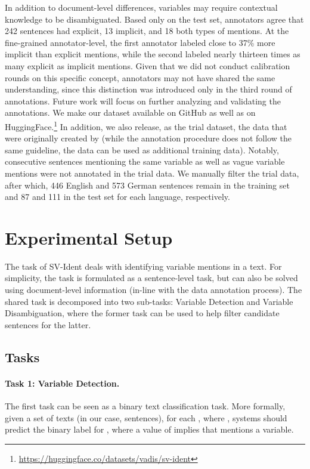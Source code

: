 \documentclass[11pt]{article}
\begin{document}
In addition to document-level differences, variables may require contextual knowledge to be disambiguated.
Based only on the test set, annotators agree that 242 sentences had explicit, 13 implicit, and 18 both types of mentions.
At the fine-grained annotator-level, the first annotator labeled close to 37\% more implicit than explicit mentions, while the second labeled nearly thirteen times as many explicit as implicit mentions.
Given that we did not conduct calibration rounds on this specific concept, annotators may not have shared the same understanding, since this distinction was introduced only in the third round of annotations.
Future work will focus on further analyzing and validating the annotations.
We make our dataset available on GitHub as well as on HuggingFace.\footnote{\url{https://huggingface.co/datasets/vadis/sv-ident}}
In addition, we also release, as the trial dataset, the data that were originally created by \citet{zielinski-mutschke-2018-towards} (while the annotation procedure does not follow the same guideline, the data can be used as additional training data).
Notably, consecutive sentences mentioning the same variable as well as vague variable mentions were not annotated in the trial data.
We manually filter the trial data, after which, 446 English and 573 German sentences remain in the training set and 87 and 111 in the test set for each language, respectively.


\section{Experimental Setup}
\label{sec:experimental-setup}
The task of SV-Ident deals with identifying variable mentions in a text.
For simplicity, the task is formulated as a sentence-level task, but can also be solved using document-level information (in-line with the data annotation process).
The shared task is decomposed into two sub-tasks: Variable Detection and Variable Disambiguation, where the former task can be used to help filter candidate sentences for the latter.

\subsection{Tasks}
\paragraph{Task 1: Variable Detection.} The first task can be seen as a binary text classification task.
More formally, given a set of texts  (in our case, sentences), for each , where , systems should predict the binary label  for , where a value of  implies that  mentions a variable.
\end{document}
